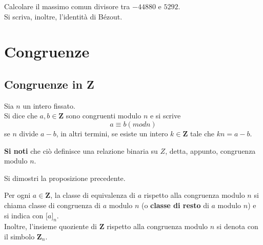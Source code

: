 \begin{flushleft}
\begin{esercizio}
Calcolare il massimo comun divisore tra $-44880$ e $5292$.\\
Si scriva, inoltre, l'identità di Bézout.
\end{esercizio}
\vspace{150px}


\section{Congruenze}
\subsection{Congruenze in Z}
\begin{definizione}
Sia $n$ un intero fissato.\\
Si dice che $a, b \in \mathbf{Z}$ sono congruenti modulo $n$ e si scrive
\[a\equiv b (mod n)\]
se $n$ divide $a-b$, in altri termini, se esiste un intero $k \in \mathbf{Z}$ tale che $kn = a-b$.
\end{definizione}
\textbf{Si noti} che ciò definisce una relazione binaria su $Z$, detta, appunto, congruenza modulo $n$.

\begin{proposizione}
\end{proposizione}
\begin{esercizio}
Si dimostri la proposizione precedente.
\end{esercizio}
\vspace{150px}

\begin{definizione}
Per ogni $a \in \mathbf{Z}$, la classe di equivalenza di $a$ rispetto alla congruenza modulo $n$ si chiama classe di congruenza di $a$ modulo $n$ (o \textbf{classe di resto} di $a$ modulo $n$) e si indica con $\big[a\big]_n$.\\
Inoltre, l'insieme quoziente di $\mathbf{Z}$ rispetto alla congruenza modulo $n$ si denota con il simbolo $\mathbf{Z}_n$.
\end{definizione}

\begin{esempio}


\end{esempio}
\end{flushleft}

